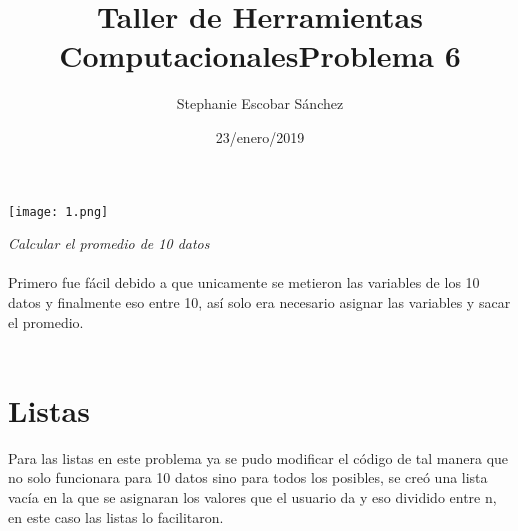\documentclass{article}
\title{\Huge Taller de Herramientas Computacionales}
\author{Stephanie Escobar Sánchez}
\date{23/enero/2019}
\begin{document}
	\maketitle
	\begin{center}
		\texttt{[image: 1.png]}	
	\end{center}
	\newpage
	\begin{center}
		\title {\Huge Problema 6} 
	\end{center}

\textit{Calcular el promedio de 10 datos}\\
\\
Primero fue fácil debido a que unicamente se metieron las variables de los 10 datos y finalmente eso entre 10, así solo era necesario asignar las variables y sacar el promedio.\\
\\
\section*{Listas}
Para las listas en este problema ya se pudo modificar el código de tal manera que no solo funcionara para 10 datos sino para todos los posibles, se creó una lista vacía en la que se asignaran los valores que el usuario da y eso dividido entre n, en este caso las listas lo facilitaron.
\end{document}
